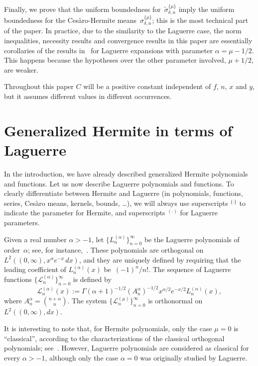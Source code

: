 \documentclass{amsart}
\theoremstyle{plain}
\theoremstyle{definition}
\theoremstyle{remark}
\newcommand{\chem}[3]{\sigma_{#1,#2}^{\{#3\}}} %
\newcommand{\chemmod}[3]{\widetilde{\sigma}_{#1,#2}^{\{#3\}}} %
\newcommand{\lagfun}[2]{\mathcal{L}_{#1}^{(#2)}}
\newcommand{\lagpol}[2]{L_{#1}^{(#2)}}
\newcommand{\combi}[2]{A_{#1}^{#2}}
\newcommand{\I}{\infty}
\begin{document}
Finally, we prove that the uniform boundedness for~$\chemmod{\delta}{n}{\mu}$ imply
the uniform boundedness for the Ces\`aro-Hermite means~$\chem{\delta}{n}{\mu}$;
this is the most technical part of the paper.
In practice, due to the similarity to the Laguerre case, the norm inequalities,
necessity results and convergence results in this paper are essentially corollaries of
the results in~\cite{MW} for Laguerre expansions with parameter $\alpha=\mu-1/2$.
This happens because the hypotheses over the other parameter involved,
$\mu+1/2$, are weaker.

Throughout this paper $C$ will be a positive constant independent of $f$, $n$, $x$ and
$y$, but it assumes different values in different occurrences.

\section{Generalized Hermite in terms of Laguerre}

In the introduction, we have already described generalized
Hermite polynomials and functions. Let us now describe
Laguerre polynomials and functions. To clearly differentiate
between Hermite and Laguerre (in polynomials, functions, series,
Ces\`aro means, kernels, bounds, \dots), we will always use superscripts
$^{\{\cdot\}}$ to indicate the parameter for Hermite,
and superscripts $^{(\cdot)}$ for Laguerre parameters.

Given a real number $\alpha > -1$, let $\{\lagpol{n}{\alpha}\}_{n=0}^\I$
be the Laguerre polynomials of order~$\alpha$;
see, for instance,~\cite[Ch.~V, \S\,2 (A), p.~144]{Ch}.
These polynomials are orthogonal on $L^2((0,\I),x^\alpha e^{-x}\,dx)$,
and they are uniquely defined by requiring that the leading coefficient
of $\lagpol{n}{\alpha}(x)$ be~$(-1)^n/n!$.
The sequence of Laguerre functions
$\{\lagfun{n}{\alpha}\}_{n = 0}^{\I}$ is defined by
\[
  \lagfun{n}{\alpha}(x) :=
  {\Gamma(\alpha + 1)}^{-1/2}
    (\combi{n}{\alpha})^{-1/2} x^{\alpha/2}
    e^{-x/2} \lagpol{n}{\alpha}(x),
\]
where $\combi{n}{\alpha} = \binom{n+\alpha}{n}$. The system $\{\lagfun{n}{\mu}\}_{n=0}^\I$ is
orthonormal on $L^2((0,\I),dx)$.

It is interesting to note that, for Hermite polynomials,
only the case $\mu=0$ is ``classical'', according to the characterizations
of the classical orthogonal polynomials; see~\cite[Ch.~V, \S\,2 (D), p.~150]{Ch}.
However, Laguerre polynomials are considered as classical for every $\alpha>-1$,
although only the case $\alpha=0$ was originally studied by Laguerre.
\end{document}
